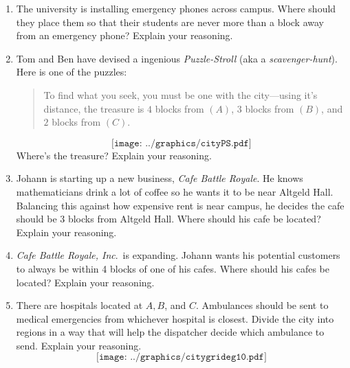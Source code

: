 \begin{problems}
\begin{enumerate}
\item The university is installing emergency phones across
  campus. Where should they place them so that their students are
  never more than a block away from an emergency phone? Explain your
  reasoning.

\item Tom and Ben have devised a ingenious
  \textit{Puzzle-Stroll} (aka a \textit{scavenger-hunt}).
  Here is one of the puzzles:
\begin{quote}
To find what you seek, you must be one with the city---using it's
distance, the treasure is $4$ blocks from $(A)$, $3$ blocks from
$(B)$, and $2$ blocks from $(C)$.
\end{quote}
\[
\texttt{[image: ../graphics/cityPS.pdf]}
\]
Where's the treasure? Explain your reasoning.

\item Johann is starting up a new business, \textit{Cafe Battle
  Royale}. He knows mathematicians drink a lot of
  coffee so he wants it to be near Altgeld Hall. Balancing this
  against how expensive rent is near campus, he decides the cafe
  should be $3$ blocks from Altgeld Hall. Where should his cafe be
  located? Explain your reasoning.


\item \emph{Cafe Battle Royale, Inc}.\ is expanding. Johann wants his
  potential customers to always be within 4 blocks of one of his
  cafes.  Where should his cafes be located? Explain your reasoning.

\item There are hospitals located at $A,B$, and $C$. Ambulances should
  be sent to medical emergencies from whichever hospital is
  closest. Divide the city into regions in a way that will help the
  dispatcher decide which ambulance to send. Explain your reasoning.
\[
\texttt{[image: ../graphics/citygrideg10.pdf]}
\]


\end{enumerate}
\end{problems}
